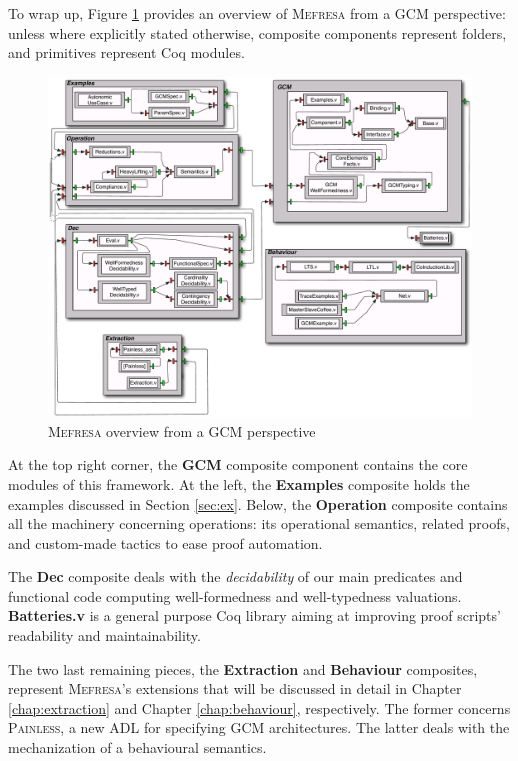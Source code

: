 	
	To wrap up, Figure \ref{fig:mefresa} provides
	an overview of \textsc{Mefresa} from a \ac{GCM} perspective: unless where explicitly stated
	otherwise, composite components
	represent folders, and primitives represent Coq modules.


	\begin{figure}%
	\centering
		\includegraphics[scale=0.4]{figures/chapter5/mefresa.pdf}
		\caption{\textsc{Mefresa} overview from a GCM perspective}		
		\label{fig:mefresa}
	\end{figure}	
	


	\noindent
	At the top right corner, the \textbf{GCM}
	composite component contains the core modules of this framework.
	At the left, the \textbf{Examples} composite holds the examples discussed
	in Section \ref{sec:ex}. 
	Below, the \textbf{Operation} composite contains all the machinery concerning
	\textsf{operations}: its operational semantics, related proofs, 
	and custom-made tactics to ease proof automation. 
	
	The \textbf{Dec} 
	composite deals with the \textit{decidability} of our main predicates and
	functional code computing well-formedness and well-typedness valuations. 
	\textbf{Batteries.v} is a general purpose 
	Coq library aiming at improving proof scripts' readability and maintainability.	
	
	The two last remaining pieces, the \textbf{Extraction} and 
	\textbf{Behaviour} composites, represent \textsc{Mefresa}'s extensions
	that will be discussed in detail in Chapter \ref{chap:extraction} and 
	Chapter \ref{chap:behaviour},	respectively. The former
	concerns \textsc{Painless}, a new \ac{ADL} for specifying
	\ac{GCM} architectures. The latter deals with the
	mechanization of a behavioural semantics.
	
